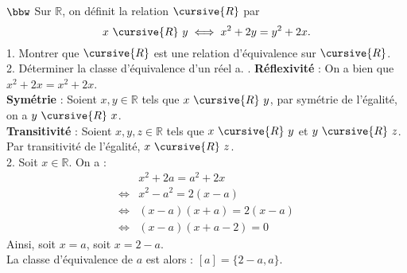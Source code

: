 \documentclass[11pt]{article}
\renewcommand*{\r}{\cursive{R}}
\begin{document}
\begin{exercice}{$\bbw$}{}
    Sur $\mathbb{R}$, on définit la relation $\r$ par
    \begin{equation*}
        x~\r~y \iff x^2 + 2y = y^2 + 2x.
    \end{equation*}
    1. Montrer que $\r$ est une relation d'équivalence sur $\r$.\\
    2. Déterminer la classe d'équivalence d'un réel a.
    . \textbf{Réflexivité} : On a bien que $x^2 + 2x = x^2 + 2x$.\\
    \textbf{Symétrie} : Soient $x,y\in\mathbb{R}$ tels que $x~\r~y$, par symétrie de l'égalité, on a $y~\r~x$.\\
    \textbf{Transitivité} : Soient $x,y,z\in\mathbb{R}$ tels que $x~\r~y$ et $y~\r~z$. Par transitivité de l'égalité, $x~\r~z$.\\[0.15cm]
    2. Soit $x\in\mathbb{R}$. On a :
    \begin{align*}
        &x^2 + 2a = a^2 + 2x\\
        \iff&x^2 - a^2 = 2(x-a)\\
        \iff&(x-a)(x+a)=2(x-a)\\
        \iff&(x-a)(x+a-2)=0
    \end{align*}
    Ainsi, soit $x=a$, soit $x=2-a$.\\
    La classe d'équivalence de $a$ est alors : $[a]=\{2-a,a\}$.
\end{exercice}

\pagebreak
\end{document}
